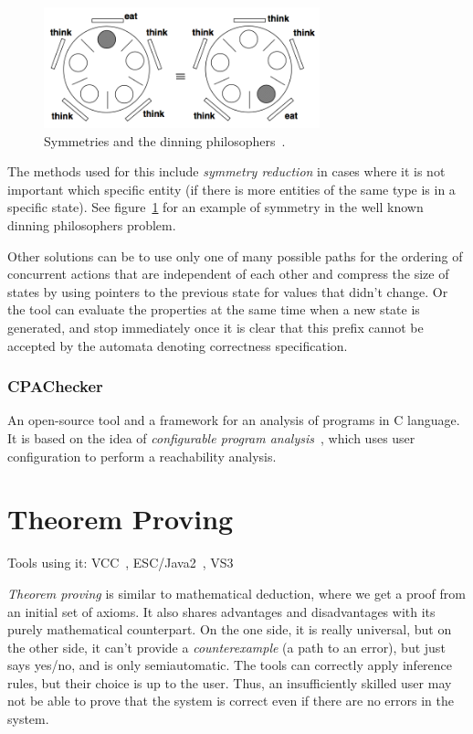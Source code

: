 \begin{figure}
  \centering
 \includegraphics[width=8cm,keepaspectratio]{fig/dinning-symmetry} %
\caption{Symmetries and the dinning philosophers~\cite{KrenaVojnarOverview}.}
\label{fig:fav:dinning}
\end{figure}

The methods used for this include {\em symmetry reduction} in cases where it is not important which specific entity (if there is more entities of the same type is in a specific state). See figure~\ref{fig:fav:dinning} for an example of symmetry in the well known dinning philosophers problem.

Other solutions can be to use only one of many possible paths for the ordering of concurrent actions that are independent of each other and compress the size of states by using pointers to the previous state for values that didn't change. Or the tool can evaluate the properties at the same time when a new state is generated, and stop immediately once it is clear that this prefix cannot be accepted by the automata denoting correctness specification.


\subsubsection{CPAChecker}

An open-source tool and a framework for an analysis of programs in C language. It is based on the idea of {\em configurable program analysis}~\cite{CPAChecker}, which uses user configuration to perform a reachability analysis.


\section{Theorem Proving}\label{chap:fav:theoremProving}
Tools using it: VCC~\cite{KrenaVojnarOverview}, ESC/Java2~\cite{KrenaVojnarOverview}, VS3~\cite{KrenaVojnarOverview}

{\em Theorem proving} is similar to mathematical deduction, where we get a proof from an initial set of axioms. It also shares advantages and disadvantages with its purely mathematical counterpart. On the one side, it is really universal, but on the other side, it can't provide a {\em counterexample} (a path to an error), but just says yes/no, and is only semiautomatic. The tools can correctly apply inference rules, but their choice is up to the user. Thus, an insufficiently skilled user may not be able to prove that the system is correct even if there are no errors in the system.


